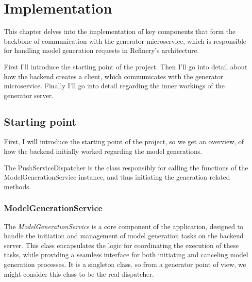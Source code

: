 \chapter{Implementation} \label{Implementation}

	This chapter delves into the implementation of key components that form the backbone of communication with the generator microservice, 
	which is responsible for handling model generation requests in Refinery's architecture.

	First I'll introduce the starting point of the project.
	Then I'll go into detail about how the backend creates a client, which communicates with the generator microservice. Finally I'll go into detail
	regarding the inner workings of the generator server.

	\section{Starting point} \label{Starting point}
		First, I will introduce the starting point of the project, so we get an overview, of how the backend initially worked regarding the model
		generations.

		The PushServiceDispatcher is the class responsibly for calling the functions of the ModelGenerationService instance, and thus initiating
		the generation related methods.

		\subsection{ModelGenerationService} \label{ModelGenerationService}
			The \textit{ModelGenerationService} is a core component of the application, designed to handle the initiation and management of
			model generation tasks on the backend server. This class encapsulates the logic for coordinating the execution of these 
			tasks, while providing a seamless interface for both initiating and canceling model generation processes.
			It is a singleton class, so from a generator point of view, we might consider this class to be the real dispatcher.

